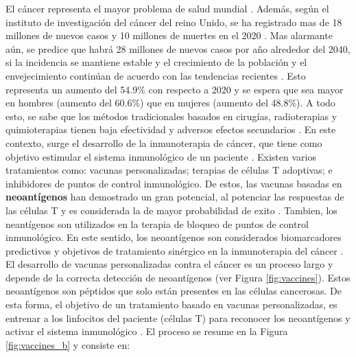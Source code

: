 \documentclass[a4paper]{article}
\begin{document}
	El cáncer representa el mayor problema de salud mundial \citep{siegel2023cancer}. Además, según el instituto de investigación del cáncer del reino Unido, se ha registrado mas de 18 millones de nuevos casos y 10 millones de muertes en el 2020 \citep{cancerUK2023}. Mas alarmante aún, se predice que habrá 28 millones de nuevos casos por año alrededor del 2040, si la incidencia se mantiene estable y el crecimiento de la población y el envejecimiento continúan de acuerdo con las tendencias recientes \citep{cancerUK2023_2}. Esto representa un aumento del 54.9\% con respecto a 2020 y se espera que sea mayor en hombres (aumento del 60.6\%) que en mujeres (aumento del 48.8\%).	A todo esto, se sabe que los métodos tradicionales basados en cirugías, radioterapias y quimioterapias tienen baja efectividad y adversos efectos secundarios \citep{peng2019neoantigen}. En este contexto, surge el desarrollo de la inmunoterapia de cáncer, que tiene como objetivo estimular el sistema inmunológico de un paciente \citep{borden2022cancer}. Existen varios tratamientos como: vacunas personalizadas; terapias de células T adoptivas; e inhibidores de puntos de control inmunológico. De estos, las vacunas basadas en \textbf{neoantígenos} han demostrado un gran potencial, al potenciar las respuestas de las células T y es considerada la de mayor probabilidad de exito \citep{borden2022cancer}. Tambien, los neantígenos son utilizados en la terapia de bloqueo de puntos de control inmunológico. En este sentido, los neoantígenos son considerados biomarcadores predictivos y objetivos de tratamiento sinérgico en la inmunoterapia del cáncer \citep{fang2022neoantigens}.\\
	

	
	
	El desarrollo de vacunas personalizadas contra el cáncer es un proceso largo y depende de la correcta detección de neoantígenos (ver Figura \ref{fig:vaccines}). Estos neoantígenos son péptidos que solo están presentes en las células cancerosas. De esta forma, el objetivo de un tratamiento basado en vacunas personalizadas, es entrenar a los linfocitos del paciente (células T) para reconocer los neoantígenos y activar el sistema inmunológico \citep{de2020neoantigen, peng2019neoantigen}. El proceso se resume en la Figura \ref{fig:vaccines_b} y consiste en: 
	
\end{document}

